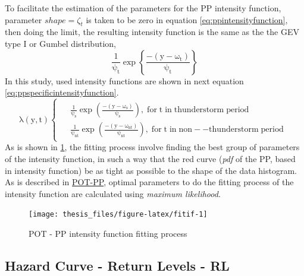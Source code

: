 \documentclass[12pt,oneside]{reedthesis}
\begin{document}
To facilitate the estimation of the parameters for the PP intensity function, parameter \(shape = \zeta_t\) is taken to be zero in equation \eqref{eq:ppintensityfunction}, then doing the limit, the resulting intensity function is the same as the the GEV type I or Gumbel distribution,
\begin{equation}
  \mathrm{
          \frac{1}{\psi_t}\exp\left\{\frac{-(y-\omega_t)}{\psi_t}\right\}
         }
  \label{eq:ppusedif}
\end{equation}
In this study, used intensity functions are shown in next equation \eqref{eq:ppspecificintensityfunction}.
\begin{equation}
  \mathrm{
    \lambda\left(y,t\right)
    \begin{cases}
      \begin{split}
            &\frac{1}{\psi_s}\exp\left(\frac{-(y-\omega_s)}{\psi_s}\right),\;for\;t\;in\;thunderstorm\;period
            \\
            &\frac{1}{\psi_{nt}}\exp\left(\frac{-(y-\omega_{nt})}{\psi_{nt}}\right),\;for\;t\;in\;non--thunderstorm\;period      
      \end{split}
    \end{cases}
  }
  \label{eq:ppspecificintensityfunction}
\end{equation}
As is shown in \ref{fig:fitif}, the fitting process involve finding the best group of parameters of the intensity function, in such a way that the red curve (\emph{pdf} of the PP, based in intensity function) be as tight as possible to the shape of the data histogram. As is described in \protect\hyperlink{pot-pp}{POT-PP}, optimal parameters to do the fitting process of the intensity function are calculated using \emph{maximum likelihood}.

\footnotesize
\begin{figure}

{\centering \texttt{[image: thesis\_files/figure-latex/fitif-1]} 

}

\caption{POT - PP intensity function fitting process}\label{fig:fitif}
\end{figure}
\normalsize

\hypertarget{hazard-curve---return-levels---rl}{%
\subsection{Hazard Curve - Return Levels - RL}\label{hazard-curve---return-levels---rl}}
\end{document}
